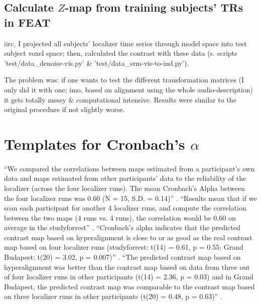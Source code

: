 \subsection{Calculate $Z$-map from training subjects' TRs in FEAT}

iirc, I projected all subjects' localizer time series through
model space into test subject voxel space; then, calculated the contrast
with these data (s. scripts 'test/data\_denoise-vis.py' \&
'test/data\_srm-vis-to-ind.py').
%

The problem was: if one wants to test the different transformation matrices (I
only did it with one; imo, based on alignment using the whole audio-description)
it gets totally messy \& computational intensive.
%
Results were similar to the original procedure if not slightly worse.



\pagebreak

\section{Templates for Cronbach's $\alpha$}


\paragraph{\citet{jiahui2020predicting}}
%
``We compared the correlations between maps estimated from a participant's own
data and maps estimated from other participants' data to the reliability of the
localizer (across the four localizer runs).
%
The mean Cronbach's Alpha between the four localizer runs was 0.60 (N = 15, S.D.
= 0.14)'' \citep{jiahui2020predicting}.
%
``Results mean that if we scan each participant for another 4 localizer
runs, and compute the correlation between the two maps (4 runs vs. 4 runs), the
correlation would be 0.60 on average in the studyforrest''
\citep{jiahui2020predicting}.
%
``Cronbach's alpha indicates that the predicted contrast map based on
hyperalignment is close to or as good as the real contrast map based on four
localizer runs (studyforrest: t(14) = 0.61, p = 0.55; Grand Budapest: t(20) =
3.02, p = 0.007)'' \citep{jiahui2020predicting}.
%
``The predicted contrast map based on hyperalignment was better than the
contrast map based on data from three out of four localizer runs in other
participants (t(14) = 2.36, p = 0.03) and in Grand Budapest, the predicted
contrast map was comparable to the contrast map based on three localizer runs in
other participants (t(20) = 0.48, p = 0.63)''
\citep{jiahui2020predicting}.



